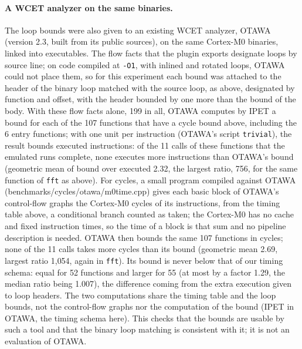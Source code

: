 \documentclass[oneside,english]{amsart}
\numberwithin{equation}{section}
\theoremstyle{plain}
\theoremstyle{definition}
\theoremstyle{plain}
\theoremstyle{plain}
\theoremstyle{remark}
\newcommand{\lean}[1]{{\ttfamily\small #1}}
\begin{document}
\paragraph{A WCET analyzer on the same binaries.}
The loop bounds were also given to an existing WCET analyzer, OTAWA \cite{ballabriga2010otawa} (version 2.3, built from its public sources), on the same Cortex-M0 binaries, linked into executables. The flow facts that the plugin exports designate loops by source line; on code compiled at \texttt{-O1}, with inlined and rotated loops, OTAWA could not place them, so for this experiment each bound was attached to the header of the binary loop matched with the source loop, as above, designated by function and offset, with the header bounded by one more than the bound of the body. With these flow facts alone, 199 in all, OTAWA computes by IPET a bound for each of the 107 functions that have a cycle bound above, including the 6 entry functions; with one unit per instruction (OTAWA's script \texttt{trivial}), the result bounds executed instructions: of the 11 calls of these functions that the emulated runs complete, none executes more instructions than OTAWA's bound (geometric mean of bound over executed 2.32, the largest ratio, 756, for the same function of \texttt{fft} as above). For cycles, a small program compiled against OTAWA (\lean{benchmarks/cycles/otawa/m0time.cpp}) gives each basic block of OTAWA's control-flow graphs the Cortex-M0 cycles of its instructions, from the timing table above, a conditional branch counted as taken; the Cortex-M0 has no cache and fixed instruction times, so the time of a block is that sum and no pipeline description is needed. OTAWA then bounds the same 107 functions in cycles; none of the 11 calls takes more cycles than its bound (geometric mean 2.69, largest ratio 1{,}054, again in \texttt{fft}). Its bound is never below that of our timing schema: equal for 52 functions and larger for 55 (at most by a factor 1.29, the median ratio being 1.007), the difference coming from the extra execution given to loop headers. The two computations share the timing table and the loop bounds, not the control-flow graphs nor the computation of the bound (IPET in OTAWA, the timing schema here). This checks that the bounds are usable by such a tool and that the binary loop matching is consistent with it; it is not an evaluation of OTAWA.
\end{document}
